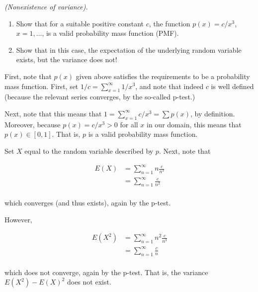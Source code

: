 \begin{problem}[Handout 7, \# 8]
  \emph{(Nonexistence of variance).}
  \begin{enumerate}[label=(\alph*),noitemsep]
  \item Show that for a suitable positive constant \(c\), the function
    \(p(x)=c/x^3\), \(x=1,\dots\), is a valid probability mass function
    (PMF).
  \item Show that in this case, the expectation of the underlying random
    variable exists, but the variance does not!
  \end{enumerate}

\end{problem}
\begin{solution}

First, note that $p(x)$ given above satisfies the requirements to be a probability mass function. First, set $1/c = \sum\limits_{x=1}^\infty 1/x^3$, and note that indeed $c$ is well defined (because the relevant series converges, by the so-called p-test.)

Next, note that this means that $1= \sum\limits_{x=1}^\infty c/x^3 = \sum\limits p(x)$, by definition. Moreover, because $p(x) = c/x^3 > 0$ for all $x$ in our domain, this means that $p(x) \in [0,1]$. That is, $p$ is a valid probability mass function.

Set $X$ equal to the random variable described by $p$. Next, note that

\begin{align*}
E(X) &= \sum\limits_{n=1}^\infty n \frac{c}{n^3}\\
&= \sum\limits_{n=1}^\infty \frac{c}{n^2}\\
\end{align*}

which converges (and thus exists), again by the p-test.

However,

\begin{align*}
E(X^2) &= \sum\limits_{n=1}^\infty n^2 \frac{c}{n^3}\\
&= \sum\limits_{n=1}^\infty \frac{c}{n}\\
\end{align*}

which does not converge, again by the p-test. That is, the variance $E(X^2)-E(X)^2$ does not exist.

\end{solution}
\newpage


